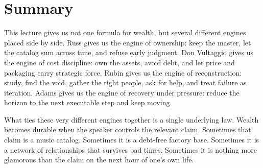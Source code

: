 \section{Summary}

This lecture gives us not one formula for wealth, but several different engines placed side by side. Russ gives us the engine of ownership: keep the master, let the catalog sum across time, and refuse early judgment. Don Vultaggio gives us the engine of cost discipline: own the assets, avoid debt, and let price and packaging carry strategic force. Rubin gives us the engine of reconstruction: study, find the void, gather the right people, ask for help, and treat failure as iteration. Adams gives us the engine of recovery under pressure: reduce the horizon to the next executable step and keep moving.

What ties these very different engines together is a single underlying law. Wealth becomes durable when the speaker controls the relevant claim. Sometimes that claim is a music catalog. Sometimes it is a debt-free factory base. Sometimes it is a network of relationships that survives bad times. Sometimes it is nothing more glamorous than the claim on the next hour of one's own life.